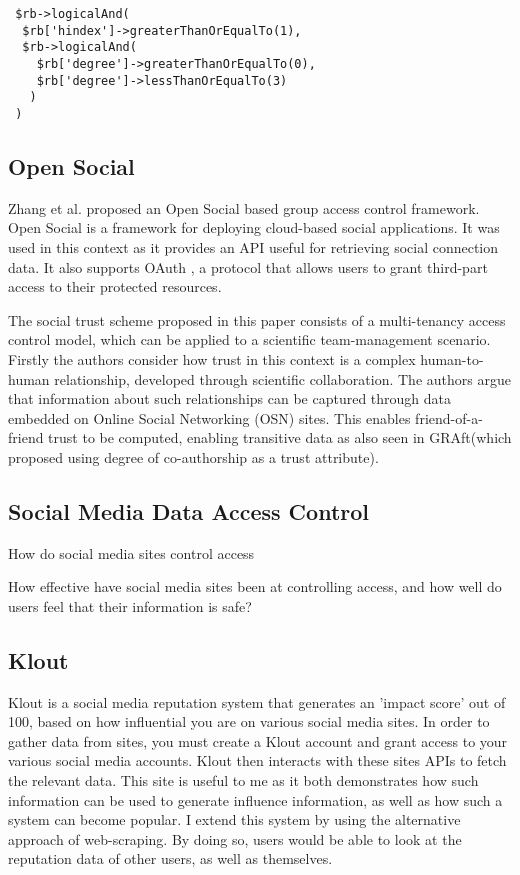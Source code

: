 \begin{verbatim}
 $rb->logicalAnd(
  $rb['hindex']->greaterThanOrEqualTo(1),
  $rb->logicalAnd(
    $rb['degree']->greaterThanOrEqualTo(0),
    $rb['degree']->lessThanOrEqualTo(3)
   )
 )
\end{verbatim}


\subsection{Open Social}

Zhang et al. \cite{} proposed an Open Social based group access control framework. Open Social is a framework for deploying cloud-based social applications. It was used in this context as it provides an API useful for retrieving social connection data. It also supports OAuth \cite{}, a protocol that allows users to grant third-part access to their protected resources.

The social trust scheme proposed in this paper consists of a multi-tenancy access control model, which can be applied to a scientific team-management scenario. Firstly the authors consider how trust in this context is a complex human-to-human relationship, developed through scientific collaboration. The authors argue that information about such relationships can be captured through data embedded on Online Social Networking (OSN) sites. This enables friend-of-a-friend trust to be computed, enabling transitive data as also seen in GRAft(which proposed using degree of co-authorship as a trust attribute).

\subsection{Social Media Data Access Control}

How do social media sites control access

How effective have social media sites been at controlling access, and how well do users feel that their information is safe?


\subsection{Klout}

Klout \cite{} is a social media reputation system that generates an 'impact score' out of 100, based on how influential you are on various social media sites. In order to gather data from sites, you must create a Klout account and grant access to your various social media accounts. Klout then interacts with these sites APIs to fetch the relevant data. This site is useful to me as it both demonstrates how such information can be used to generate influence information, as well as how such a system can become popular. I extend this system by using the alternative approach of web-scraping. By doing so, users would be able to look at the reputation data of other users, as well as themselves. 




